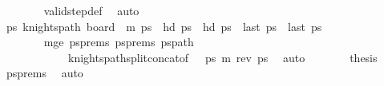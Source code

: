 \begin{isabellebody}
\ \ \ \ \ \ \isamarkupfalse%
\ valid{\isacharunderscore}{\kern0pt}step{\isacharunderscore}{\kern0pt}def\ \isamarkupfalse%
\ auto\isanewline
\ \ \ \ \isamarkupfalse%
\ \isamarkupfalse%
\ {\isachardoublequoteopen}{\isasymexists}ps{\isachardot}{\kern0pt}\ knights{\isacharunderscore}{\kern0pt}path\ {\isacharparenleft}{\kern0pt}board\ {}\ m{\isacharparenright}{\kern0pt}\ ps\ {\isasymand}\ hd\ ps\ {\isacharequal}{\kern0pt}\ hd\ {\isacharquery}{\kern0pt}ps\ {\isasymand}\ last\ ps\ {\isacharequal}{\kern0pt}\ last\ {\isacharquery}{\kern0pt}ps\ \ \ \ \ \ \ \ \ \ \ \ \ \ \isanewline
\ \ \ \ \ \ \isamarkupfalse%
\ m{\isacharunderscore}{\kern0pt}ge\ psprems\ psprems{\isacharprime}{\kern0pt}\ pspath\ \isanewline
\ \ \ \ \ \ \ \ \ \ \ \ knights{\isacharunderscore}{\kern0pt}path{\isacharunderscore}{\kern0pt}split{\isacharunderscore}{\kern0pt}concat{\isacharbrackleft}{\kern0pt}of\ {}\ {}\ {\isacharquery}{\kern0pt}ps\ {\isachardoublequoteopen}m{\isacharminus}{\kern0pt}{}{\isachardoublequoteclose}\ {\isachardoublequoteopen}rev\ ps\ \isamarkupfalse%
\ auto\isanewline
\ \ \ \ \isamarkupfalse%
\ \isamarkupfalse%
\ {\isacharquery}{\kern0pt}thesis\ \isamarkupfalse%
\ psprems\ \isamarkupfalse%
\ auto\isanewline
\ \ \isamarkupfalse%
\isanewline
{}\isamarkupfalse%
%
\endisatagproof
{\isafoldproof}%
%
\isadelimproof
%
\endisadelimproof
%
\begin{isamarkuptext}%

\end{isamarkuptext}
\end{isabellebody}
